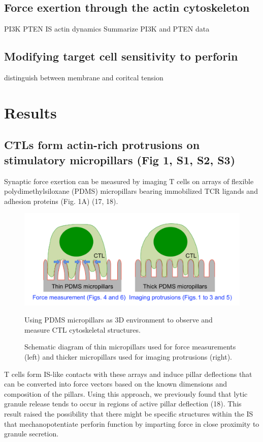 \subsection{Force exertion through the actin cytoskeleton}
PI3K PTEN IS actin dynamics
Summarize PI3K and PTEN data

\subsection{Modifying target cell sensitivity to perforin}
distinguish between membrane and coritcal tension

\section{Results} 

\subsection{CTLs form actin-rich protrusions on stimulatory micropillars (Fig 1, S1, S2, S3)}
Synaptic force exertion can be measured by imaging T cells on arrays of flexible polydimethylsiloxane (PDMS) micropillars bearing immobilized TCR ligands and adhesion proteins (Fig. 1A) (17, 18). 

\begin{figure}[htbp]
	\centering
	\includegraphics[width=\textwidth]{../figures/chapter2/fig1pillarscartoon.png}
	\caption{Using PDMS micropillars as 3D environment to observe and measure CTL cytoskeletal structures.}
	\caption*{Schematic diagram of thin micropillars used for force measurements (left) and thicker micropillars used for imaging protrusions (right).}
	\label{fig:fig1pillarscartoon}
\end{figure}

T cells form IS-like contacts with these arrays and induce pillar deflections that can be converted into force vectors based on the known dimensions and composition of the pillars. Using this approach, we previously found that lytic granule release tends to occur in regions of active pillar deflection (18). This result raised the possibility that there might be specific structures within the IS that mechanopotentiate perforin function by imparting force in close proximity to granule secretion.

